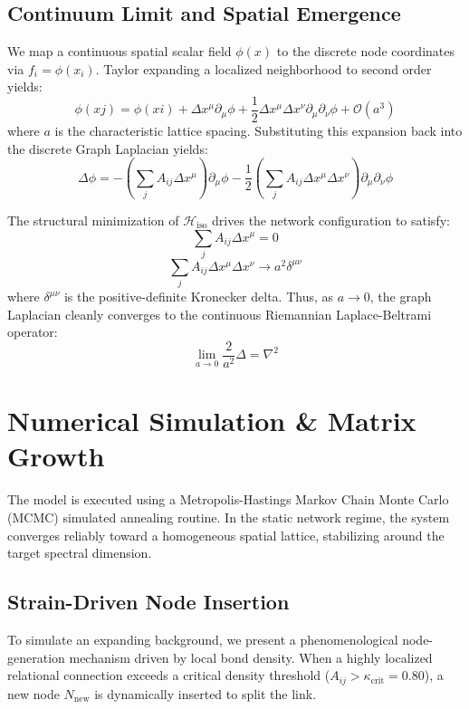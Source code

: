 \documentclass[11pt,twocolumn,a4paper]{article}
\begin{document}
\subsection{Continuum Limit and Spatial Emergence}
We map a continuous spatial scalar field $\phi(x)$ to the discrete node coordinates via $f_i = \phi(x_i)$. Taylor expanding a localized neighborhood to second order yields:
\begin{equation}
\phi(xj) = \phi(xi) + \Delta x^\mu \partial_\mu \phi + \frac{1}{2}\Delta x^\mu \Delta x^\nu \partial_\mu \partial_\nu \phi + \mathcal{O}(a^3)
\end{equation}
where $a$ is the characteristic lattice spacing. Substituting this expansion back into the discrete Graph Laplacian yields:
\begin{equation}
\Delta \phi = -\left(\sum_{j} A_{ij}\Delta x^\mu\right) \partial_\mu \phi - \frac{1}{2}\left(\sum_{j} A_{ij}\Delta x^\mu \Delta x^\nu\right) \partial_\mu \partial_\nu \phi
\end{equation}

The structural minimization of $\mathcal{H}_{\text{iso}}$ drives the network configuration to satisfy:
\begin{equation}
\sum_{j} A_{ij}\Delta x^\mu = 0
\end{equation}
\begin{equation}
\sum_{j} A_{ij}\Delta x^\mu \Delta x^\nu \rightarrow a^2 \delta^{\mu\nu}
\end{equation}
where $\delta^{\mu\nu}$ is the positive-definite Kronecker delta. Thus, as $a \rightarrow 0$, the graph Laplacian cleanly converges to the continuous Riemannian Laplace-Beltrami operator:
\begin{equation}
\lim_{a \rightarrow 0} \frac{2}{a^2} \Delta = \nabla^2
\end{equation}

\section{Numerical Simulation \& Matrix Growth}
The model is executed using a Metropolis-Hastings Markov Chain Monte Carlo (MCMC) simulated annealing routine. In the static network regime, the system converges reliably toward a homogeneous spatial lattice, stabilizing around the target spectral dimension.

\subsection{Strain-Driven Node Insertion}
To simulate an expanding background, we present a phenomenological node-generation mechanism driven by local bond density. When a highly localized relational connection exceeds a critical density threshold ($A_{ij} > \kappa_{\text{crit}} = 0.80$), a new node $N_{\text{new}}$ is dynamically inserted to split the link.
\end{document}
